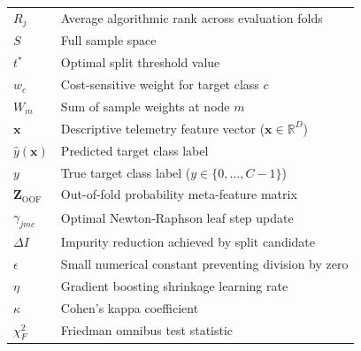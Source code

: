 \documentclass[10pt,conference,compsoc]{IEEEtran}
\begin{document}
\begin{table}[t]
\begin{tabular}{lp{6.0cm}}
$R_j$ & Average algorithmic rank across evaluation folds \\
$S$ & Full sample space \\
$t^*$ & Optimal split threshold value \\
$w_c$ & Cost-sensitive weight for target class $c$ \\
$W_m$ & Sum of sample weights at node $m$ \\
$\mathbf{x}$ & Descriptive telemetry feature vector ($\mathbf{x} \in \mathbb{R}^D$) \\
$\hat{y}(\mathbf{x})$ & Predicted target class label \\
$y$ & True target class label ($y \in \{0, \dots, C-1\}$) \\
$\mathbf{Z}_{\text{OOF}}$ & Out-of-fold probability meta-feature matrix \\
$\gamma_{jmc}$ & Optimal Newton-Raphson leaf step update \\
$\Delta I$ & Impurity reduction achieved by split candidate \\
$\epsilon$ & Small numerical constant preventing division by zero \\
$\eta$ & Gradient boosting shrinkage learning rate \\
$\kappa$ & Cohen's kappa coefficient \\
$\chi_F^2$ & Friedman omnibus test statistic \\
\bottomrule
\end{tabular}
\end{table}
\end{document}
